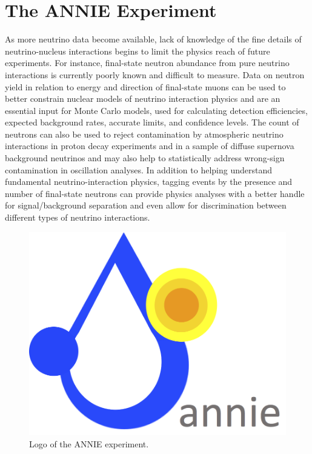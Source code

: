 
\chapter{The ANNIE Experiment}
\label{cha:2}

 As more neutrino data become available, lack of knowledge of the fine details of %
 neutrino-nucleus interactions begins to limit the physics reach of future experiments. 
 For instance, final-state neutron abundance from pure neutrino interactions is currently %
 poorly known and difficult to measure.
 Data on neutron yield in relation to energy and direction of final-state muons can be used to %
 better constrain nuclear models of neutrino interaction %
 physics and are an essential input for Monte Carlo models, used for calculating %
 detection efficiencies, expected background rates, accurate limits, and confidence levels.
 The count of neutrons can also be used to reject contamination by atmospheric %
 neutrino interactions in proton decay experiments and in a sample of diffuse supernova %
 background neutrinos and may also help to statistically address wrong-sign contamination %
 in oscillation analyses.
 In addition to helping understand fundamental neutrino-interaction physics, tagging events %
 by the presence and number of final-state neutrons can provide physics analyses with a better %
 handle for signal/background separation and even allow for discrimination between %
 different types of neutrino interactions.

 \begin{figure}
   \centering
   \includegraphics[scale=.2]{pics/logo_2}
   \caption{Logo of the ANNIE experiment.}
   \label{fig:logo}
 \end{figure}

